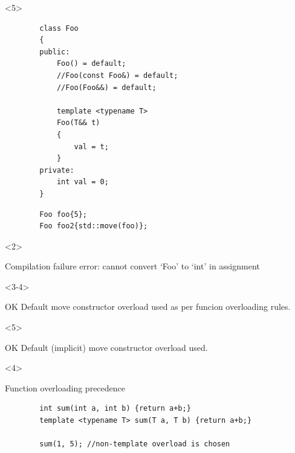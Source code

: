 \documentclass{beamer}
\begin{document}
\begin{frame}[fragile,t]
    \begin{onlyenv}<5>
    \begin{lstlisting}
        class Foo
        {
        public:
            Foo() = default;
            //Foo(const Foo&) = default;
            //Foo(Foo&&) = default;
            
            template <typename T>
            Foo(T&& t)
            {
                val = t;
            }
        private:
            int val = 0;
        }
    \end{lstlisting}
    \end{onlyenv}

    \hrulefill
    \begin{lstlisting}
        Foo foo{5};
        Foo foo2{std::move(foo)};
    \end{lstlisting}

    \begin{onlyenv}<2>
        \begin{alertblock}{Compilation failure}
            error: cannot convert ‘Foo’ to ‘int’ in assignment
        \end{alertblock}
    \end{onlyenv}

    \begin{onlyenv}<3-4>
        \begin{block}{OK}
            Default move constructor overload used as per funcion overloading rules.
        \end{block}
    \end{onlyenv}

    \begin{onlyenv}<5>
        \begin{block}{OK}
            Default (implicit) move constructor overload used.
        \end{block}
    \end{onlyenv}
    
    \begin{onlyenv}<4>
    \begin{block}{Function overloading precedence}
    \begin{lstlisting}
        int sum(int a, int b) {return a+b;}
        template <typename T> sum(T a, T b) {return a+b;}

        sum(1, 5); //non-template overload is chosen
    \end{lstlisting}
    \end{block}
    \end{onlyenv}

\end{frame}
\end{document}
